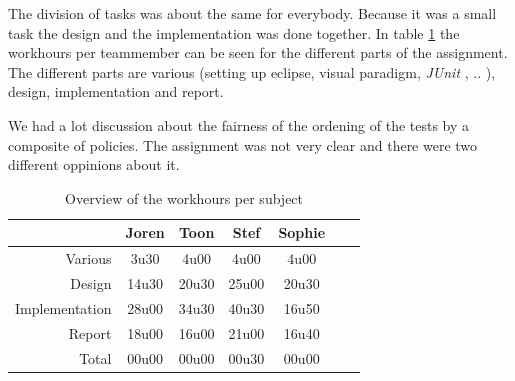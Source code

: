 \documentclass[i3]{oss}
\newcommand{\junit}{\emph{JUnit }}
\begin{document}
The division of tasks was about the same for everybody. Because it was a small task the design and the implementation was done together. In table \ref{tab:werkuren} the workhours per teammember can be seen for the different parts of the assignment. The different parts are various (setting up eclipse, visual paradigm, \junit, .. ), design, implementation and report. 

We had a lot discussion about the fairness of the ordening of the tests by a composite of policies. The assignment was not very clear and there were two different oppinions about it.  





\begin{table}[h!]
\begin{center}
    \begin{tabular}{ r | c  c  c  c  c  c}
     & Joren & Toon & Stef & Sophie \\ \hline
    	Various & 		3u30 & 4u00 & 4u00 & 4u00\\
        Design & 		14u30 & 20u30 & 25u00 & 20u30 \\
        Implementation & 28u00 & 34u30 & 40u30 & 16u50\\
        Report & 		18u00 & 16u00 & 21u00 & 16u40 \\
        Total & 		00u00 & 00u00 & 00u30 & 00u00  
    \end{tabular}
    \caption{Overview of the workhours per subject}
    \label{tab:werkuren}
\end{center}
\end{table}
\end{document}
